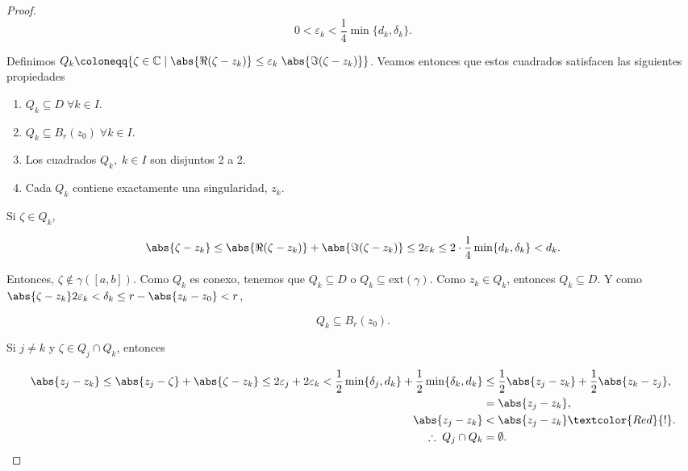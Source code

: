 \documentclass[../main.tex]{subfiles}
\begin{document}
\begin{proof}
    \begin{equation*}
        0 < \varepsilon_{k} < \dfrac{1}{4}\min\{d_{k}, \delta_{k}\}.
    \end{equation*}

    Definimos \(Q_{k} \coloneqq \{\zeta\in \mathbb{C} \mid \abs{\Re(\zeta - z_{k})} \leq
    \varepsilon_{k}\; \abs{\Im(\zeta - z_{k})}\}\). Veamos entonces que estos cuadrados
    satisfacen las siguientes propiedades

    \begin{enumerate}
        \item \(Q_{k} \subseteq D\; \forall k\in I\).
        \item \(Q_{k} \subseteq B_{r}(z_{0})\; \forall k\in I\).
        \item Los cuadrados \(Q_{k},\; k\in I\) son disjuntos 2 a 2.
        \item Cada \(Q_{k}\) contiene exactamente una singularidad, \(z_{k}\).
    \end{enumerate}

    Si \(\zeta \in Q_{k}\),

    \begin{equation*}
        \abs{\zeta - z_{k}} \leq \abs{\Re(\zeta - z_{k})} + \abs{\Im(\zeta -
        z_{k})} \leq
        2\varepsilon_{k} \leq 2 \cdot \dfrac{1}{4}\min\{d_{k}, \delta_{k}\} < d_{k}.
    \end{equation*}

    Entonces, \(\zeta \notin \gamma([a, b])\). Como \(Q_{k}\) es conexo, tenemos que
    \(Q_{k} \subseteq D\) o \(Q_{k} \subseteq \mathrm{ext}(\gamma)\). Como \(z_{k}\in
    Q_{k}\), entonces \(Q_{k} \subseteq D\). Y como \(\abs{\zeta - z_{k}}
        2\varepsilon_{k}
    < \delta_{k} \leq r - \abs{z_{k} - z_{0}} < r\),

    \begin{equation*}
        Q_{k} \subseteq B_{r}(z_{0}).
    \end{equation*}

    Si \(j \neq k\) y \(\zeta \in Q_{j}\cap Q_{k}\), entonces

    \begin{align*}
        \abs{z_{j} - z_{k}} \leq \abs{z_{j} - \zeta} + \abs{\zeta - z_{k}} \leq
        2\varepsilon_{j} + 2\varepsilon_{k} < \dfrac{1}{2}\min\{\delta_{j}, d_{k}\} +
        \dfrac{1}{2}\min\{\delta_{k}, d_{k}\} &\leq \dfrac{1}{2}\abs{z_{j} - z_{k}} +
        \dfrac{1}{2}\abs{z_{k} - z_{j}},\\
        &= \abs{z_{j} - z_{k}},\\
        \abs{z_{j} - z_{k}} &< \abs{z_{j} - z_{k}} \textcolor{Red}{!}.\\
        \therefore\; Q_{j}\cap Q_{k} &= \emptyset.
    \end{align*}


\end{proof}
\end{document}
